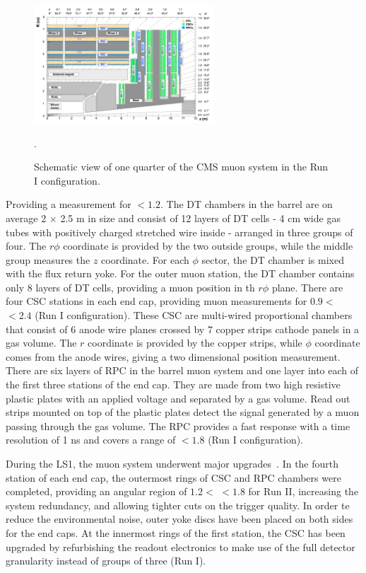 \begin{figure}[ht!]
	\centering
	\includegraphics[width=0.6\textwidth]{2_ExperimentalSetup/Figures/muonsys}
	\caption{Schematic view of one quarter of the CMS muon system in the Run I configuration. \cite{Chatrchyan:1223944}}.
	\label{fig:muonsys}
\end{figure}


Providing a measurement for \abspsrap $<1.2$. The DT chambers in the barrel are on average 2 $\times$ 2.5 \si{ \meter} in size and consist of 12 layers of DT cells - 4 \si{ \centi \meter} wide gas tubes with positively charged stretched wire inside - arranged in three groups of four. The $r\phi$ coordinate is provided by the two outside groups, while the middle group measures the $z$ coordinate. For each $\phi$ sector, the DT chamber is mixed with the flux return yoke. For the outer muon station, the DT chamber contains only 8 layers of DT cells, providing a muon position in th $r\phi$ plane.
There are four CSC stations in each end cap, providing muon measurements for $0.9<$ \abspsrap $<2.4$ (Run I configuration). These CSC are multi-wired proportional chambers that consist of 6 anode wire planes crossed by 7 copper strips cathode panels in a gas volume. The $r$ coordinate is provided by the copper strips, while $\phi$ coordinate comes from the anode wires, giving a two dimensional position measurement. 
There are six layers of RPC in the barrel muon system and one layer into each of the first three stations of the end cap. They are made from two high resistive plastic plates with an applied voltage and separated by a gas volume. Read out strips mounted on top of the plastic plates detect the signal generated by a muon passing through the gas volume. The RPC provides a fast response with a time resolution of 1 \si{ \nano \second} and covers a range of \abspsrap $<1.8$ (Run I configuration). 


During the LS1, the  muon system underwent major upgrades~\cite{Guiducci:1966038,Battilana:2239185}. In the fourth station of each end cap, the outermost rings of CSC and RPC chambers were completed, providing an angular region of $1.2<$ \abspsrap $<1.8$ for Run II, increasing the system redundancy, and allowing tighter cuts on the trigger quality. In order te reduce the environmental noise, outer yoke discs have been placed on both sides for the end caps. 
At the innermost rings of the first station, the CSC has been upgraded by refurbishing the readout electronics to make use of the full detector granularity instead of groups of three (Run I). 


